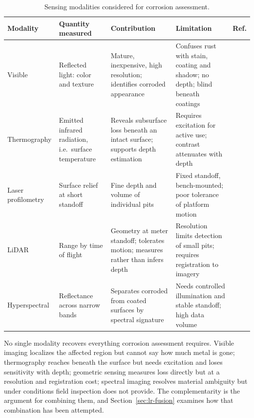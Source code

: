\begin{table}[htbp]
\centering
\caption{Sensing modalities considered for corrosion assessment.}
\label{tab:modalities}
\scriptsize
\renewcommand{\arraystretch}{1.2}
\begin{tabularx}{\textwidth}{@{}l X X X l@{}}
\toprule
\textbf{Modality} & \textbf{Quantity measured} & \textbf{Contribution} & \textbf{Limitation} & \textbf{Ref.} \\
\midrule
Visible & Reflected light: color and texture & Mature, inexpensive, high resolution; identifies corroded appearance & Confuses rust with stain, coating and shadow; no depth; blind beneath coatings & \citep{Alvani2026,Nash2022,Lavadiya2022,Lim2021} \\
Thermography & Emitted infrared radiation, i.e.\ surface temperature & Reveals subsurface loss beneath an intact surface; supports depth estimation & Requires excitation for active use; contrast attenuates with depth & \citep{Lim2021,Doshvarpassand2022,Elizalde2023} \\
Laser profilometry & Surface relief at short standoff & Fine depth and volume of individual pits & Fixed standoff, bench-mounted; poor tolerance of platform motion & \citep{Haitz2022} \\
LiDAR & Range by time of flight & Geometry at meter standoff; tolerates motion; measures rather than infers depth & Resolution limits detection of small pits; requires registration to imagery & \citep{Maru2025,PimenteldeFigueiredo2025} \\
Hyperspectral & Reflectance across narrow bands & Separates corroded from coated surfaces by spectral signature & Needs controlled illumination and stable standoff; high data volume & \citep{Lavadiya2022,Arias2025,DeKerf2022} \\
\bottomrule
\end{tabularx}
\end{table}

No single modality recovers everything corrosion assessment requires. Visible
imaging localizes the affected region but cannot say how much metal is gone;
thermography reaches beneath the surface but needs excitation and loses
sensitivity with depth; geometric sensing measures loss directly but at a
resolution and registration cost; spectral imaging resolves material ambiguity
but under conditions field inspection does not provide. The complementarity is
the argument for combining them, and Section~\ref{sec:lr-fusion} examines how
that combination has been attempted.

